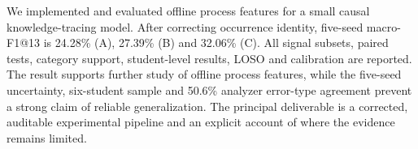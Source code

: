 We implemented and evaluated offline process features for a small causal knowledge-tracing model. After correcting occurrence identity, five-seed macro-F1@13 is 24.28\% (A), 27.39\% (B) and 32.06\% (C). All signal subsets, paired tests, category support, student-level results, LOSO and calibration are reported. The result supports further study of offline process features, while the five-seed uncertainty, six-student sample and 50.6\% analyzer error-type agreement prevent a strong claim of reliable generalization. The principal deliverable is a corrected, auditable experimental pipeline and an explicit account of where the evidence remains limited.
